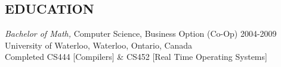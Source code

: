 \documentclass[10pt,line,margin=0.1]{newsres}
\begin{document}
\begin{resume}
\section{EDUCATION} {\sl Bachelor of Math,} Computer Science, Business Option (Co-Op) 2004-2009 \\
                University of Waterloo, Waterloo, Ontario, Canada \\
                Completed CS444 [Compilers] \& CS452 [Real Time Operating Systems]


\end{resume}
\end{document}

